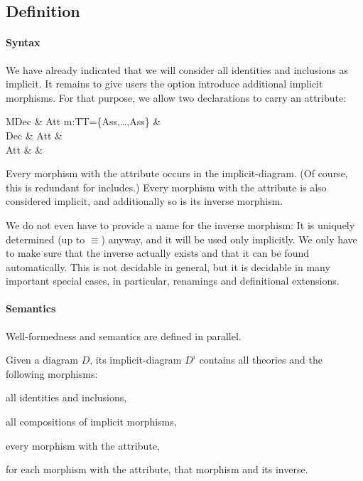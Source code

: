 
\subsection{Definition}

\paragraph{Syntax}
We have already indicated that we will consider all identities and inclusions as implicit.
It remains to give users the option introduce additional implicit morphisms.
For that purpose, we allow two \mmt declarations to carry an attribute: 
\begin{grammar}
MDec   & Att\; m:T\to T=\{Ass,\ldots,Ass\}   &  \\
Dec    & Att\;                        & \\
Att    &  \alt {} & 
\end{grammar}

Every morphism with the attribute  occurs in the implicit-diagram.
(Of course, this is redundant for includes.)
Every morphism with the attribute  is also considered implicit, and additionally so is its inverse morphism.

We do not even have to provide a name for the inverse morphism: It is uniquely determined (up to $\equiv$) anyway, and it will be used only implicitly.
We only have to make sure that the inverse actually exists and that it can be found automatically.
This is not decidable in general, but it is decidable in many important special cases, in particular, renamings and definitional extensions.

\paragraph{Semantics}
Well-formedness and semantics are defined in parallel.

\begin{definition}
Given a diagram $D$, its implicit-diagram $D^i$ contains all theories and the following morphisms:
\begin{compactitem}
\item all identities and inclusions,
\item all compositions of implicit morphisms,
\item every morphism with the  attribute,
\item for each morphism with the  attribute, that morphism and its inverse. 
\end{compactitem}
\end{definition} 

